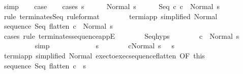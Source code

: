 \begin{isabellebody}
\ simp\isanewline
\ \ \isamarkupfalse%
\ {\isacharquery}case\isanewline
\ \ \isamarkupfalse%
\ {\isacharparenleft}cases\ s{\isacharparenright}\isanewline
\ \ \ \ \isamarkupfalse%
\ {\isacharparenleft}Normal\ s{\isacharprime}{\isacharparenright}\isanewline
\ \ \ \ \isamarkupfalse%
\ {\isachardoublequoteopen}{\isasymGamma}{\isasymturnstile}Seq\ c{}\ c{}\ {\isasymdown}\ Normal\ s{\isacharprime}{\isachardoublequoteclose}\isanewline
\ \ \ \ \isamarkupfalse%
\ {\isacharparenleft}rule\ terminates{\isachardot}Seq\ {\isacharbrackleft}rule{\isacharunderscore}format{\isacharbrackright}{\isacharparenright}\isanewline
\ \ \ \ \ \ \isamarkupfalse%
\ termi{\isacharunderscore}app\ {\isacharbrackleft}simplified\ Normal{\isacharbrackright}\isanewline
\ \ \ \ \ \ \isamarkupfalse%
\ {\isachardoublequoteopen}{\isasymGamma}{\isasymturnstile}sequence\ Seq\ {\isacharparenleft}flatten\ c{}{\isacharparenright}\ {\isasymdown}\ Normal\ s{\isacharprime}{\isachardoublequoteclose}\isanewline
\ \ \ \ \ \ \ \ \isamarkupfalse%
\ {\isacharparenleft}cases\ rule{\isacharcolon}\ terminates{\isacharunderscore}sequence{\isacharunderscore}appE{\isacharparenright}\isanewline
\ \ \ \ \ \ \isamarkupfalse%
\ Seq{\isachardot}hyps\isanewline
\ \ \ \ \ \ \isamarkupfalse%
\ {\isachardoublequoteopen}{\isasymGamma}{\isasymturnstile}c{}\ {\isasymdown}\ Normal\ s{\isacharprime}{\isachardoublequoteclose}\isanewline
\ \ \ \ \ \ \ \ \isamarkupfalse%
\ simp\isanewline
\ \ \ \ \isamarkupfalse%
\isanewline
\ \ \ \ \ \ \isamarkupfalse%
\ s{\isacharprime}{\isacharprime}\isanewline
\ \ \ \ \ \ \isamarkupfalse%
\ {\isachardoublequoteopen}{\isasymGamma}{\isasymturnstile}{\isasymlangle}c{}{\isacharcomma}Normal\ s{\isacharprime}\ {\isasymrangle}\ {\isasymRightarrow}\ s{\isacharprime}{\isacharprime}{\isachardoublequoteclose}\isanewline
\ \ \ \ \ \ \isamarkupfalse%
\ termi{\isacharunderscore}app\ {\isacharbrackleft}simplified\ Normal{\isacharbrackright}\ exec{\isacharunderscore}to{\isacharunderscore}exec{\isacharunderscore}sequence{\isacharunderscore}flatten\ {\isacharbrackleft}OF\ this{\isacharbrackright}\isanewline
\ \ \ \ \ \ \isamarkupfalse%
\ {\isachardoublequoteopen}{\isasymGamma}{\isasymturnstile}sequence\ Seq\ {\isacharparenleft}flatten\ c{}{\isacharparenright}\ {\isasymdown}\ s{\isacharprime}{\isacharprime}{\isachardoublequoteclose}\isanewline

\end{isabellebody}

